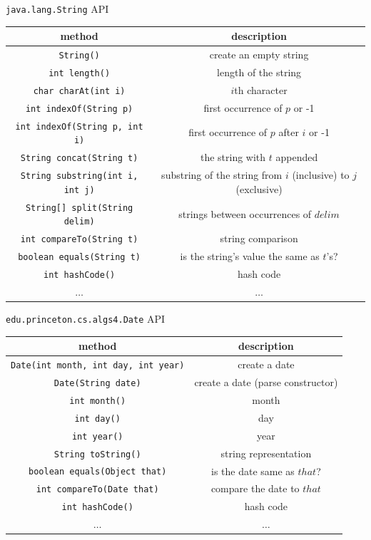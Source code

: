 \documentclass[8pt,a4paper,compress]{beamer}
\begin{document}
\begin{frame}[fragile]
\lstinline{java.lang.String} API
\begin{center}
\begin{tabular}{cc}
method & description \\ \hline
\lstinline$String()$ & create an empty string \\
\lstinline$int length()$ & length of the string \\
\lstinline$char charAt(int i)$ & $i$th character \\
\lstinline$int indexOf(String p)$ & first occurrence of $p$ or -1 \\ \lstinline$int indexOf(String p, int i)$ & first occurrence of $p$ after $i$ or -1 \\
\lstinline$String concat(String t)$ & the string with $t$ appended \\
\lstinline$String substring(int i, int j)$ & substring of the string from $i$ (inclusive) to $j$ (exclusive) \\
\lstinline$String[] split(String delim)$ & strings between occurrences of $delim$ \\
\lstinline$int compareTo(String t)$ & string comparison \\
\lstinline$boolean equals(String t)$ & is the string's value the same as $t$'s? \\
\lstinline$int hashCode()$ & hash code \\
$\dots$ & $\dots$
\end{tabular} 
\end{center}
\end{frame}

\begin{frame}[fragile]
\lstinline{edu.princeton.cs.algs4.Date} API
\begin{center}
\begin{tabular}{cc}
method & description \\ \hline
\lstinline$Date(int month, int day, int year)$ & create a date \\
\lstinline$Date(String date)$ & create a date (parse constructor) \\
\lstinline$int month()$ &  month \\
\lstinline$int day()$ & day \\
\lstinline$int year()$ & year \\
\lstinline$String toString()$ & string representation \\
\lstinline$boolean equals(Object that)$ & is the date same as $that$? \\
\lstinline$int compareTo(Date that)$ & compare the date to $that$ \\
\lstinline$int hashCode()$ & hash code \\
$\dots$ & $\dots$
\end{tabular} 
\end{center}
\end{frame}
\end{document}
